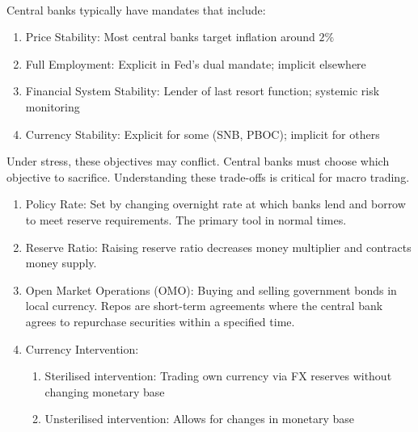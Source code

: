 \documentclass[a4paper,oneside,openany]{book}
\begin{document}
\begin{remark} \\
Central banks typically have mandates that include:
\begin{enumerate}[label=\roman*.]
\setlength{\itemsep}{0pt}
\item Price Stability: Most central banks target inflation around $2\%$
\item Full Employment: Explicit in Fed's dual mandate; implicit elsewhere
\item Financial System Stability: Lender of last resort function; systemic risk monitoring
\item Currency Stability: Explicit for some (SNB, PBOC); implicit for others
\end{enumerate}
Under stress, these objectives may conflict. Central banks must choose which objective to sacrifice. Understanding these trade-offs is critical for macro trading.
\end{remark}

\begin{remark} 
\begin{enumerate}[label=\roman*.]
\setlength{\itemsep}{0pt}
\item Policy Rate: Set by changing overnight rate at which banks lend and borrow to meet reserve requirements. The primary tool in normal times.
\item Reserve Ratio: Raising reserve ratio decreases money multiplier and contracts money supply.
\item Open Market Operations (OMO): Buying and selling government bonds in local currency. Repos are short-term agreements where the central bank agrees to repurchase securities within a specified time.
\item Currency Intervention:
\begin{enumerate}[label=\arabic*.]
\setlength{\itemsep}{0pt}
\item Sterilised intervention: Trading own currency via FX reserves without changing monetary base
\item Unsterilised intervention: Allows for changes in monetary base
\end{enumerate}
\end{enumerate}
\end{remark}
\end{document}
